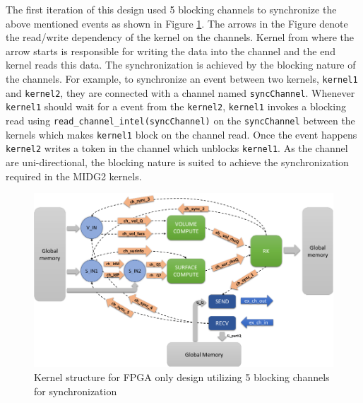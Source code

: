 The first iteration of this design used 5 blocking channels to synchronize the above mentioned
events as shown in Figure \ref{fig:channelsync_kernstruc}.
The arrows in the Figure denote the read/write dependency of the kernel on the channels.
Kernel from where the arrow starts is responsible for writing the data into the channel
and the end kernel reads this data. The synchronization is achieved by the blocking
nature of the channels. For example, to synchronize an event between two kernels,
\texttt{kernel1} and \texttt{kernel2}, they are connected with a channel named \texttt{syncChannel}.
Whenever \texttt{kernel1} should wait for a event from the \texttt{kernel2},
\texttt{kernel1} invokes a blocking read using \texttt{read\_channel\_intel(syncChannel)} on the
\texttt{syncChannel} between the kernels which makes
\texttt{kernel1} block on the channel read. Once the event happens \texttt{kernel2} writes a token in the channel
which unblocks \texttt{kernel1}. As the channel are uni-directional, the blocking nature is suited
to achieve the synchronization required in the MIDG2 kernels.

\begin{figure}[ht]%
    \centering
    \includegraphics[width=1.0\textwidth]{images/channelssync_kernstruc}
    \caption{Kernel structure for FPGA only design utilizing 5 blocking channels for synchronization}
    \label{fig:channelsync_kernstruc}
\end{figure}

